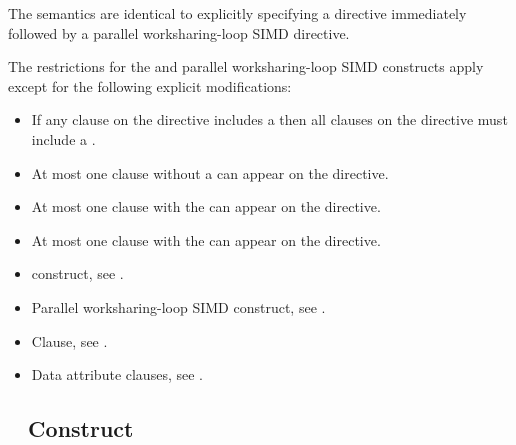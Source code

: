 \descr
The semantics are identical to explicitly specifying a  directive
immediately followed by a parallel worksharing-loop SIMD directive.


\restrictions
The restrictions for the  and parallel worksharing-loop SIMD constructs apply except for the following explicit modifications:

\begin{itemize}
\item If any  clause on the directive includes a
       then all  clauses
      on the directive must include a .

\item At most one  clause without a
       can appear on the directive.

\item At most one  clause with the 
       can appear on the directive.


\item At most one  clause with the 
       can appear on the directive.
\end{itemize}

\crossreferences
\begin{itemize}
\item {} construct, see
.

\item Parallel worksharing-loop SIMD construct, see
.

\item {} Clause, see .

\item Data attribute clauses, see
.

\end{itemize}










\subsection{~ Construct}
\label{subsec:target simd Construct}

